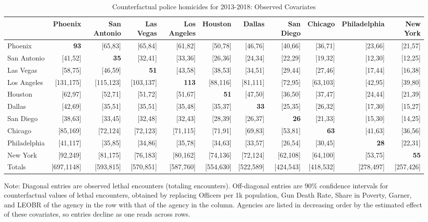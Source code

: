 \begin{table}[h!]\centering\scriptsize\tabcolsep=0.1cm\caption{Counterfactual police homicides for 2013-2018: Observed Covariates} \label{table:counterfactual_obs}\begin{tabular}{lrrrrrrrrrr}\hline \hline&Phoenix&San Antonio&Las Vegas&Los Angeles&Houston&Dallas&San Diego&Chicago&Philadelphia&New York\\
\hline
Phoenix&\textbf{93}&[65,83]&[65,84]&[61,82]&[50,78]&[46,76]&[40,66]&[36,71]&[23,66]&[21,57]\\
San Antonio&[41,52]&\textbf{35}&[32,41]&[33,36]&[26,36]&[24,34]&[22,29]&[19,32]&[12,30]&[12,25]\\
Las Vegas&[58,75]&[46,59]&\textbf{51}&[43,58]&[38,53]&[34,51]&[29,44]&[27,46]&[17,44]&[16,38]\\
Los Angeles&[131,175]&[115,123]&[103,137]&\textbf{113}&[88,116]&[81,111]&[72,95]&[63,103]&[42,95]&[39,80]\\
Houston&[62,97]&[52,71]&[51,72]&[51,67]&\textbf{51}&[47,50]&[36,50]&[37,47]&[24,44]&[21,39]\\
Dallas&[42,69]&[35,51]&[35,51]&[35,48]&[35,37]&\textbf{33}&[25,35]&[26,32]&[17,30]&[15,27]\\
San Diego&[38,63]&[33,45]&[32,48]&[32,43]&[28,39]&[26,37]&\textbf{26}&[21,33]&[15,30]&[14,25]\\
Chicago&[85,169]&[72,124]&[72,123]&[71,115]&[71,91]&[69,83]&[53,81]&\textbf{63}&[41,63]&[36,56]\\
Philadelphia&[41,117]&[35,85]&[34,86]&[35,78]&[34,63]&[33,57]&[26,54]&[30,45]&\textbf{28}&[22,31]\\
New York&[92,249]&[81,175]&[76,183]&[80,162]&[74,136]&[72,124]&[62,108]&[64,100]&[53,75]&\textbf{55}\\
\hline
Totals&[697,1148]&[593,815]&[570,851]&[587,760]&[554,630]&[522,589]&[424,543]&[418,532]&[278,497]&[257,426]\\
\hline 
 \end{tabular} 
 \begin{center} 
 \begin{minipage}{1.05\textwidth} %
 {\footnotesize Note: Diagonal entries are observed lethal encounters (totaling \totalincidentsten{} encounters). Off-diagonal entries are 90\% confidence intervals for counterfactual values of lethal encounters, obtained by replacing Officers per 1k population, Gun Death Rate, Share in Poverty, Garner, and LEOBR of the agency in the row with that of the agency in the column. Agencies are listed in decreasing order by the estimated effect of these covariates, so entries decline as one reads across rows.} 
 \end{minipage} 
 \end{center} 
 \end{table}